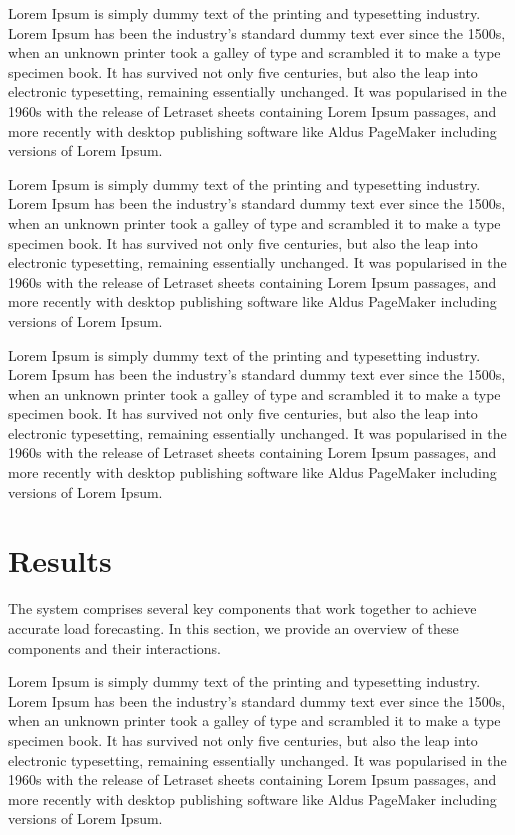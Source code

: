 \documentclass[conference]{IEEEtran}
\begin{document}
Lorem Ipsum is simply dummy text of the printing and typesetting industry. Lorem Ipsum has been the industry's standard dummy text ever since the 1500s, when an unknown printer took a galley of type and scrambled it to make a type specimen book. It has survived not only five centuries, but also the leap into electronic typesetting, remaining essentially unchanged. It was popularised in the 1960s with the release of Letraset sheets containing Lorem Ipsum passages, and more recently with desktop publishing software like Aldus PageMaker including versions of Lorem Ipsum.

Lorem Ipsum is simply dummy text of the printing and typesetting industry. Lorem Ipsum has been the industry's standard dummy text ever since the 1500s, when an unknown printer took a galley of type and scrambled it to make a type specimen book. It has survived not only five centuries, but also the leap into electronic typesetting, remaining essentially unchanged. It was popularised in the 1960s with the release of Letraset sheets containing Lorem Ipsum passages, and more recently with desktop publishing software like Aldus PageMaker including versions of Lorem Ipsum.

Lorem Ipsum is simply dummy text of the printing and typesetting industry. Lorem Ipsum has been the industry's standard dummy text ever since the 1500s, when an unknown printer took a galley of type and scrambled it to make a type specimen book. It has survived not only five centuries, but also the leap into electronic typesetting, remaining essentially unchanged. It was popularised in the 1960s with the release of Letraset sheets containing Lorem Ipsum passages, and more recently with desktop publishing software like Aldus PageMaker including versions of Lorem Ipsum.


\section{Results}
The system comprises several key components that work together to achieve accurate load forecasting. In this section, we provide an overview of these components and their interactions.

Lorem Ipsum is simply dummy text of the printing and typesetting industry. Lorem Ipsum has been the industry's standard dummy text ever since the 1500s, when an unknown printer took a galley of type and scrambled it to make a type specimen book. It has survived not only five centuries, but also the leap into electronic typesetting, remaining essentially unchanged. It was popularised in the 1960s with the release of Letraset sheets containing Lorem Ipsum passages, and more recently with desktop publishing software like Aldus PageMaker including versions of Lorem Ipsum.
\end{document}
